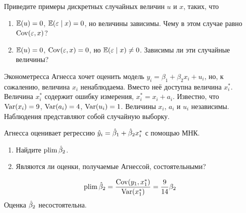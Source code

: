 \begin{problem}
Приведите примеры дискретных случайных величин $u$ и $x$, таких, что
\begin{enumerate}
\item $\operatorname{\mathbb E}(u)=0$, $\operatorname{\mathbb E}(\varepsilon\mid x)=0$, но величины зависимы. Чему в этом случае равно $\operatorname{Cov}(\varepsilon,x)$?
\item $\operatorname{\mathbb E}(u)=0$, $\operatorname{Cov}(\varepsilon,x)=0$, но $\operatorname{\mathbb E}(\varepsilon\mid x)\neq 0$. Зависимы ли эти случайные величины?
\end{enumerate}


\begin{sol}
\end{sol}
\end{problem}


\begin{problem}
Эконометресса Агнесса хочет оценить модель $y_i=\beta_1+\beta_2 x_i +u_i$, но, 
к сожалению, величина $x_i$ ненаблюдаема. Вместо неё доступна величина  $x_i^*$. 
Величина $x_i^*$  содержит ошибку измерения, $x_i^*=x_i+a_i$. 
Известно, что $\operatorname{Var}(x_i)=9$, $\operatorname{Var}(a_i)=4$,   $\operatorname{Var}(u_i)=1$. 
Величины $x_i$, $a_i$ и $u_i$ независимы.
Наблюдения представляют собой случайную выборку.

Агнесса оценивает регрессию $\hat{y}_i=\hat{\beta}_1+\hat{\beta}_2 x_i^*$ с помощью МНК.
\begin{enumerate}
\item Найдите $\operatorname*{plim} \hat{\beta}_2$.
\item Являются ли оценки, получаемые Агнессой, состоятельными?
\end{enumerate}


\begin{sol}
  \[
  \operatorname*{plim} \hat{\beta}_2 = \frac{\operatorname{Cov}(y_1, x_1^*)}{\operatorname{Var}(x_1^*)} = \frac{9}{14}\beta_2
  \]
  Оценка $\hat{\beta}_2$ несостоятельна.
\end{sol}
\end{problem}


